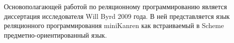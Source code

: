 Основополагающей работой по реляционному программированию является диссертация исследователя Will Byrd 2009 года. В ней представляется язык реляционного программирования miniKanren как встраиваемый в Scheme предметно-ориентированный язык.
%


